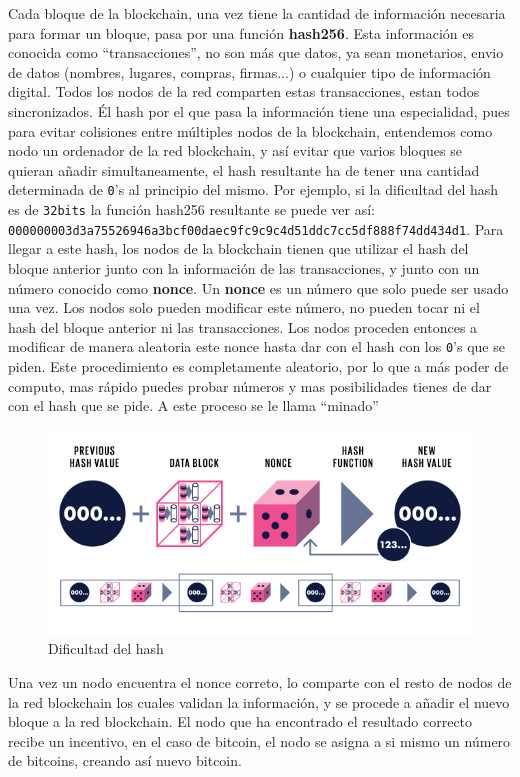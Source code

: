 Cada bloque de la blockchain, una vez tiene la cantidad de información necesaria para formar un bloque, pasa por una función \textbf{hash256}. Esta información es conocida como ``transacciones'', no son más que datos, ya sean monetarios, envio de datos (nombres, lugares, compras, firmas...) o cualquier tipo de información digital. Todos los nodos de la red comparten estas transacciones, estan todos sincronizados. Él hash por el que pasa la información tiene una especialidad, pues para evitar colisiones entre múltiples nodos de la blockchain, entendemos como nodo un ordenador de la red blockchain, y así evitar que varios bloques se quieran añadir simultaneamente, el hash resultante ha de tener una cantidad determinada de \verb|0|'s al principio del mismo. Por ejemplo, si la dificultad del hash es de \verb|32bits| la función hash256 resultante se puede ver así: \verb|000000003d3a75526946a3bcf00daec9fc9c9c4d51ddc7cc5df888f74dd434d1|. Para llegar a este hash, los nodos de la blockchain tienen que utilizar el hash del bloque anterior junto con la información de las transacciones, y junto con un número conocido como \textbf{nonce}\cite{whatIsNonce}. Un \textbf{nonce} es un número que solo puede ser usado una vez. Los nodos solo pueden modificar este número, no pueden tocar ni el hash del bloque anterior ni las transacciones. Los nodos proceden entonces a modificar de manera aleatoria este nonce hasta dar con el hash con los \verb|0|'s que se piden. Este procedimiento es completamente aleatorio, por lo que a más poder de computo, mas rápido puedes probar números y mas posibilidades tienes de dar con el hash que se pide. A este proceso se le llama ``minado''\cite{minarBitcoin}

\begin{figure}[h!]
  \centering
  \includegraphics[width=0.8\linewidth]{figs/EstadoArte/Blockchain/hashDificultad}
  \caption[Hash dificultad]{Dificultad del hash}
  \label{fig:hashDiff}
\end{figure}

Una vez un nodo encuentra el nonce correto, lo comparte con el resto de nodos de la red blockchain los cuales validan la información, y se procede a añadir el nuevo bloque a la red blockchain. El nodo que ha encontrado el resultado correcto recibe un incentivo, en el caso de bitcoin, el nodo se asigna a si mismo un número de bitcoins, creando así nuevo bitcoin. 

